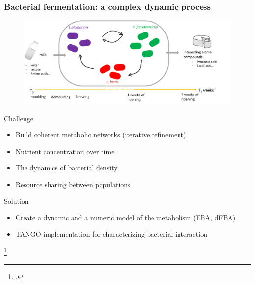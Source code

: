 \documentclass[8pt,usenames,dvipsnames]{beamer}
\begin{document}
\begin{frame}
\frametitle{Bacterial fermentation: a complex dynamic process}

\begin{figure}
\centering
\includegraphics[width=\textwidth]{figures/context-cheese}
\end{figure}

\begin{minipage}{0.5\textwidth}
\vspace{-0.3cm}
\begin{block}{Challenge}
\begin{itemize}
\item Build coherent metabolic networks (iterative refinement) %
\item Nutrient concentration over time %
\item The dynamics of bacterial density %
\item Resource sharing between populations %
\end{itemize}
\end{block}
\end{minipage}%
\hspace{0.2cm}
\hfill
\begin{minipage}{0.45\textwidth}
\vspace{-0.55cm}
\begin{alertblock}{Solution}
\begin{itemize}
\item Create a dynamic and a numeric model of the metabolism (FBA, dFBA) 
\item TANGO implementation for characterizing bacterial interaction
\end{itemize}
\end{alertblock}
\end{minipage}

\footcite{Orth2010,Mahadevan.2002} 



\end{frame}
\end{document}
